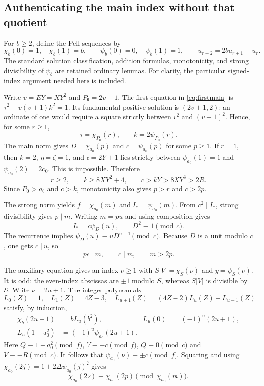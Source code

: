 \subsection{Authenticating the main index without that quotient}

For $b\ge2$, define the Pell sequences by
\[
 \chi_b(0)=1,\quad\chi_b(1)=b,\qquad
 \psi_b(0)=0,\quad\psi_b(1)=1,
 \qquad u_{r+2}=2bu_{r+1}-u_r.
\]
The standard solution classification, addition formulas, monotonicity,
and strong divisibility of $\psi_b$ are retained ordinary lemmas.
For clarity, the particular signed-index argument needed here is included.

Write $v=EY=XY^2$ and $P_0=2v+1$. The first equation in
\eqref{eq:firstmain} is $\tau^2-v(v+1)k^2=1$. Its fundamental
positive solution is $(2v+1,2)$: an ordinate of one would require a
square strictly between $v^2$ and $(v+1)^2$. Hence, for some $r\ge1$,
\[
 \tau=\chi_{P_0}(r),\qquad k=2\psi_{P_0}(r).
\]
The main norm gives $D=\chi_{a_0}(p)$ and $c=\psi_{a_0}(p)$ for
some $p\ge1$. If $r=1$, then $k=2$, $\eta=\zeta=1$, and
$c=2Y+1$ lies strictly between $\psi_{a_0}(1)=1$ and
$\psi_{a_0}(2)=2a_0$. This is impossible. Therefore
\begin{equation}\label{eq:largec}
 r\ge2,\qquad k\ge8XY^2+4,\qquad c>kY>8XY^3>2R.
\end{equation}
Since $P_0>a_0$ and $c>k$, monotonicity also gives $p>r$ and $c>2p$.

The strong norm yields $f=\chi_{a_0}(m)$ and $I_*=\psi_{a_0}(m)$.
From $c^2\mid I_*$, strong divisibility gives $p\mid m$. Writing $m=pu$
and using composition gives
\[
 I_*=c\psi_D(u),\qquad D^2\equiv1\pmod c.
\]
The recurrence implies $\psi_D(u)\equiv uD^{u-1}\pmod c$.
Because $D$ is a unit modulo $c$, one gets $c\mid u$, so
\begin{equation}\label{eq:rank}
 pc\mid m,\qquad c\mid m,\qquad m>2p.
\end{equation}

The auxiliary equation gives an index $\nu\ge1$ with
$S|V|=\chi_S(\nu)$ and $y=\psi_S(\nu)$. It is odd: the even-index
abscissas are $\pm1$ modulo $S$, whereas $S|V|$ is divisible by $S$.
Write $\nu=2u+1$. The integer polynomials
\[
 L_0(Z)=1,\quad L_1(Z)=4Z-3,\quad
 L_{u+1}(Z)=(4Z-2)L_u(Z)-L_{u-1}(Z)
\]
satisfy, by induction,
\begin{align*}
 \chi_b(2u+1)&=bL_u(b^2),&L_u(0)&=(-1)^u(2u+1),\\
 L_u(1-a_0^2)&=(-1)^u\psi_{a_0}(2u+1).
\end{align*}
Here $Q\equiv1-a_0^2\pmod f$, $V\equiv-c\pmod f$,
$Q\equiv0\pmod c$ and $V\equiv-R\pmod c$.
It follows that $\psi_{a_0}(\nu)\equiv\pm c\pmod f$.
Squaring and using $\chi_{a_0}(2j)=1+2\Delta\psi_{a_0}(j)^2$ gives
\[
 \chi_{a_0}(2\nu)\equiv\chi_{a_0}(2p)\pmod{\chi_{a_0}(m)}.
\]

